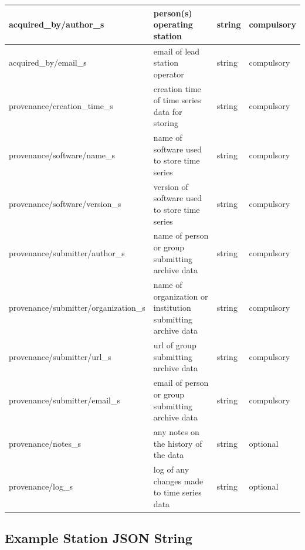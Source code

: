 \documentclass{article}
\begin{document}
\begin{table}[htb!]
\begin{tabular}{|l|p{3in}|l|l|}
		acquired\_by/author\_s & person(s) operating station & string & compulsory \\ \hline
		acquired\_by/email\_s & email of lead station operator & string & compulsory \\ \hline
		provenance/creation\_time\_s & creation time of time series data for storing & string & compulsory \\ \hline
		provenance/software/name\_s & name of software used to store time series & string & compulsory \\ \hline
		provenance/software/version\_s & version of software used to store time series & string & compulsory \\ \hline
		provenance/submitter/author\_s & name of person or group submitting archive data & string & compulsory \\ \hline
		provenance/submitter/organization\_s & name of organization or institution submitting archive data & string & compulsory \\ \hline
		provenance/submitter/url\_s & url of group submitting archive data & string & compulsory \\ \hline
		provenance/submitter/email\_s & email of person or group submitting archive data & string & compulsory  \\ \hline
		provenance/notes\_s & any notes on the history of the data & string & optional \\ \hline
		provenance/log\_s & log of any changes made to time series data & string & optional \\ \hline
	\end{tabular}
\label{tab:station01}
\end{table}	
   
\newpage
\subsection{Example Station JSON String}
\end{document}

